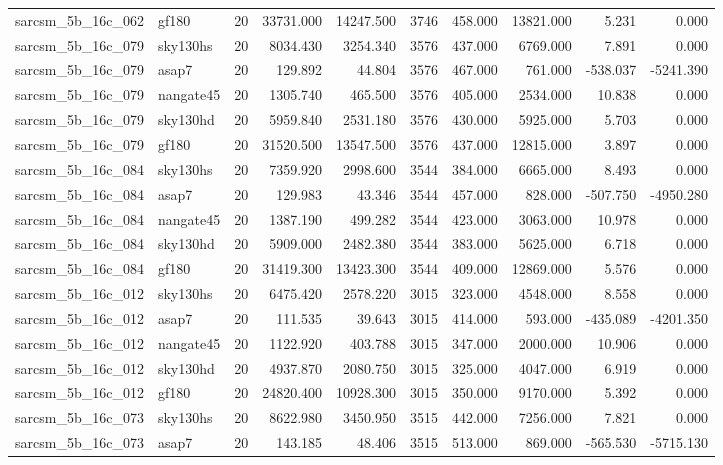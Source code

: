 \begin{tabular}{llrrrrrrrr}
sarcsm\_5b\_16c\_062 & gf180 & 20 & 33731.000 & 14247.500 & 3746 & 458.000 & 13821.000 & 5.231 & 0.000 \\
sarcsm\_5b\_16c\_079 & sky130hs & 20 & 8034.430 & 3254.340 & 3576 & 437.000 & 6769.000 & 7.891 & 0.000 \\
sarcsm\_5b\_16c\_079 & asap7 & 20 & 129.892 & 44.804 & 3576 & 467.000 & 761.000 & -538.037 & -5241.390 \\
sarcsm\_5b\_16c\_079 & nangate45 & 20 & 1305.740 & 465.500 & 3576 & 405.000 & 2534.000 & 10.838 & 0.000 \\
sarcsm\_5b\_16c\_079 & sky130hd & 20 & 5959.840 & 2531.180 & 3576 & 430.000 & 5925.000 & 5.703 & 0.000 \\
sarcsm\_5b\_16c\_079 & gf180 & 20 & 31520.500 & 13547.500 & 3576 & 437.000 & 12815.000 & 3.897 & 0.000 \\
sarcsm\_5b\_16c\_084 & sky130hs & 20 & 7359.920 & 2998.600 & 3544 & 384.000 & 6665.000 & 8.493 & 0.000 \\
sarcsm\_5b\_16c\_084 & asap7 & 20 & 129.983 & 43.346 & 3544 & 457.000 & 828.000 & -507.750 & -4950.280 \\
sarcsm\_5b\_16c\_084 & nangate45 & 20 & 1387.190 & 499.282 & 3544 & 423.000 & 3063.000 & 10.978 & 0.000 \\
sarcsm\_5b\_16c\_084 & sky130hd & 20 & 5909.000 & 2482.380 & 3544 & 383.000 & 5625.000 & 6.718 & 0.000 \\
sarcsm\_5b\_16c\_084 & gf180 & 20 & 31419.300 & 13423.300 & 3544 & 409.000 & 12869.000 & 5.576 & 0.000 \\
sarcsm\_5b\_16c\_012 & sky130hs & 20 & 6475.420 & 2578.220 & 3015 & 323.000 & 4548.000 & 8.558 & 0.000 \\
sarcsm\_5b\_16c\_012 & asap7 & 20 & 111.535 & 39.643 & 3015 & 414.000 & 593.000 & -435.089 & -4201.350 \\
sarcsm\_5b\_16c\_012 & nangate45 & 20 & 1122.920 & 403.788 & 3015 & 347.000 & 2000.000 & 10.906 & 0.000 \\
sarcsm\_5b\_16c\_012 & sky130hd & 20 & 4937.870 & 2080.750 & 3015 & 325.000 & 4047.000 & 6.919 & 0.000 \\
sarcsm\_5b\_16c\_012 & gf180 & 20 & 24820.400 & 10928.300 & 3015 & 350.000 & 9170.000 & 5.392 & 0.000 \\
sarcsm\_5b\_16c\_073 & sky130hs & 20 & 8622.980 & 3450.950 & 3515 & 442.000 & 7256.000 & 7.821 & 0.000 \\
sarcsm\_5b\_16c\_073 & asap7 & 20 & 143.185 & 48.406 & 3515 & 513.000 & 869.000 & -565.530 & -5715.130 \\

\end{tabular}

